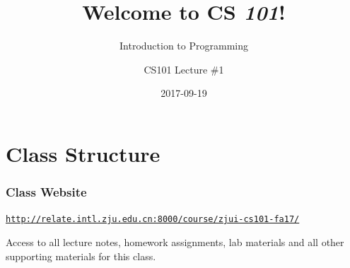 \documentclass[11pt]{beamer}
\title{Welcome to CS \emph{101}!}
\subtitle{Introduction to Programming}
\author{CS101 Lecture \#1}
\date{2017-09-19}
\begin{document}

\newcommand{\Enlarge}{\large}
\newcommand{\CSBase}{blue}
\newcommand{\CSGradBot}{orange}
\newcommand{\CSAltDark}{black}
\newcommand{\CSPureBase}{blue}

\newcommand{\myitem}{\item}
\newcommand{\mysubitem}{\item}


\frame{\titlepage}

\setcounter{framenumber}{0}

\section{Class Structure}

\begin{frame}[plain,c]
  \frametitle{Class Website}
  \Enlarge

  \begin{center}
    \textcolor{\CSBase}{\small \texttt{\url{http://relate.intl.zju.edu.cn:8000/course/zjui-cs101-fa17/}}}

    Access to all lecture notes, homework assignments, lab materials and all other supporting materials for this class.
  \end{center}
\end{frame}
\end{document}
